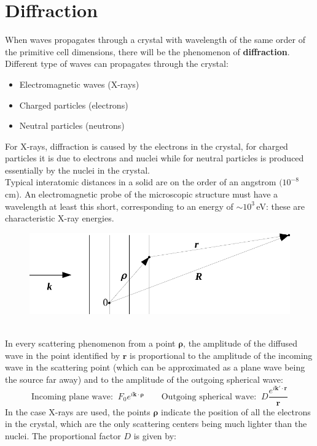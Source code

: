 \documentclass[10.75pt,a4paper,openright,bottom=2cm]{article}
\renewcommand{\Vec}[1]{\boldsymbol{#1}}
\begin{document}
\section{Diffraction}
When waves propagates through a crystal with wavelength of the same order of the primitive cell dimensions, there will be the phenomenon of \textbf{diffraction}. Different type of waves can propagates through the crystal:
\begin{itemize}
    \item Electromagnetic waves (X-rays)
    \item Charged particles (electrons)
    \item Neutral particles (neutrons)
\end{itemize}
For X-rays, diffraction is caused by the electrons in the crystal, for charged particles it is due to electrons and nuclei while for neutral particles is produced essentially by the nuclei in the crystal.\\
Typical interatomic distances in a solid are on the order of an angstrom $(10^{-8}$\,cm). An electromagnetic probe of the microscopic structure must have a wavelength at least this short, corresponding to an energy of $\sim10^3$\,eV: these are characteristic X-ray energies.
\begin{figure}[h]
    \centering
    \includegraphics{diffraction.pdf}
    \caption*{}
    \label{fig:diffraction}
\end{figure}\\
In every scattering phenomenon from a point $\Vec{\rho}$, the amplitude of the diffused wave in the point identified by $\Vec{r}$ is proportional to the amplitude of the incoming wave in the scattering point (which can be approximated as a plane wave being the source far away) and to the amplitude of the outgoing spherical wave:
\[
\text{Incoming plane wave:}\;\; F_0e^{i\Vec{k}\cdot\Vec{\rho}} \qquad \text{Outgoing spherical wave:}\;\; D\frac{e^{i\Vec{k'}\cdot\Vec{r}}}{\Vec{r}}
\]
In the case X-rays are used, the points $\Vec{\rho}$ indicate the position of all the electrons in the crystal, which are the only scattering centers being much lighter than the nuclei. The proportional factor $D$ is given by:
\end{document}
